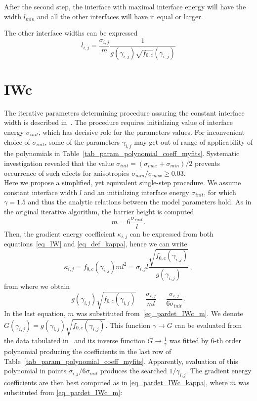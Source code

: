 After the second step, the interface with maximal interface energy will have the width $l_{min}$ and all the other interfaces will have it equal or larger.

The other interface widths can be expressed
\begin{equation}
	l_{i,j} = \frac{\sigma_{i,j}}{m}\frac{1}{g(\gamma_{i,j})\sqrt{f_{0,c}}(\gamma_{i,j})}
\end{equation}

\section{IWc}
The iterative parameters determining procedure assuring the constant interface width is described in~\cite{Moelans2008}. The procedure requires initializing value of interface energy $\sigma_{init}$, which has decisive role for the parameters values. For inconvenient choice of $\sigma_{init}$, some of the parameters $\gamma_{i,j}$ may get out of range of applicability of the polynomials in Table~\ref{tab_param_polynomial_coeff_myfits}. Systematic investigation revealed that the value $\sigma_{init}=(\sigma_{max}+\sigma_{min})/2$ prevents occurrence of such effects for anisotropies $\sigma_{min}/\sigma_{max}\geq 0.03$. \\
Here we propose a simplified, yet equivalent single-step procedure. We assume constant interface width $l$ and an initializing interface energy $\sigma_{init}$, for which $\gamma=1.5$ and thus the analytic relations between the model parameters hold. As in the original iterative algorithm, the barrier height is computed
\begin{equation} \label{eq_pardet_IWc_m}
	m = 6\frac{\sigma_{init}}{l} .
\end{equation}
Then, the gradient energy coefficient $\kappa_{i,j}$ can be expressed from both equations~\eqref{eq_IW} and \eqref{eq_def_kappa}, hence we can write
\begin{equation} \label{eq_pardet_IWc_kappa}
	\kappa_{i,j}=f_{0,c}(\gamma_{i,j})ml^2 = \sigma_{i,j}l\frac{\sqrt{f_{0,c}(\gamma_{i,j})}}{g(\gamma_{i,j})} \,,
\end{equation}
from where we obtain
\begin{equation}
	g(\gamma_{i,j})\sqrt{f_{0,c}(\gamma_{i,j})}=\frac{\sigma_{i,j}}{ml} = \frac{\sigma_{i,j}}{6\sigma_{init}} \,.
\end{equation}
In the last equation, $m$ was substituted from~\eqref{eq_pardet_IWc_m}. We denote $G(\gamma_{i,j})=g(\gamma_{i,j})\sqrt{f_{0,c}(\gamma_{i,j})}$. This function $\gamma\rightarrow G$ can be evaluated from the data tabulated in~\cite{Ravash2017} and its inverse function $G \rightarrow \frac{1}{\gamma}$ was fitted by 6-th order polynomial producing the coefficients in the last row of Table~\ref{tab_param_polynomial_coeff_myfits}. Apparently, evaluation of this polynomial in points $\sigma_{i,j}/6\sigma_{init}$ produces the searched $1/\gamma_{i,j}$. The gradient energy coefficients are then best computed as in \ref{eq_pardet_IWc_kappa}, where $m$ was substituted from \ref{eq_pardet_IWc_m}:
